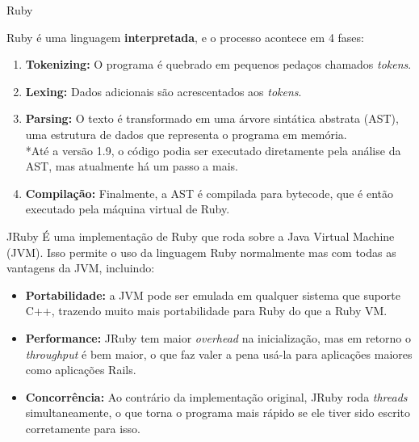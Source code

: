 \documentclass{beamer}
\begin{document}

\begin{frame}{Ruby}

Ruby é uma linguagem \textbf{interpretada}, e o processo acontece em 4 fases:

\begin{enumerate}

\item \textbf{Tokenizing:} O programa é quebrado em pequenos pedaços chamados \textit{tokens}.

\item \textbf{Lexing:} Dados adicionais são acrescentados aos \textit{tokens}.

\item \textbf{Parsing:} O texto é transformado em uma árvore sintática abstrata (AST), uma estrutura de dados que representa o programa em memória.
\\*Até a versão 1.9, o código podia ser executado diretamente pela análise da AST, mas atualmente há um passo a mais.

\item \textbf{Compilação:} Finalmente, a AST é compilada para bytecode, que é então executado pela máquina virtual de Ruby.

\end{enumerate}

\end{frame}



\begin{frame}{JRuby}
É uma implementação de Ruby que roda sobre a Java Virtual Machine (JVM). Isso permite o uso da linguagem Ruby normalmente mas com todas as vantagens da JVM, incluindo:

\begin{itemize}

\item \textbf{Portabilidade:} a JVM pode ser emulada em qualquer sistema  que suporte C++, trazendo muito mais portabilidade para Ruby do que a Ruby VM.

\item \textbf{Performance:} JRuby tem maior \textit{overhead} na inicialização, mas em retorno o \textit{throughput} é bem maior, o que faz valer a pena usá-la para aplicações maiores como aplicações Rails.

\item \textbf{Concorrência:} Ao contrário da implementação original, JRuby roda \textit{threads} simultaneamente, o que torna o programa mais rápido se ele tiver sido escrito corretamente para isso.

\end{itemize}


\end{frame}
\end{document}
